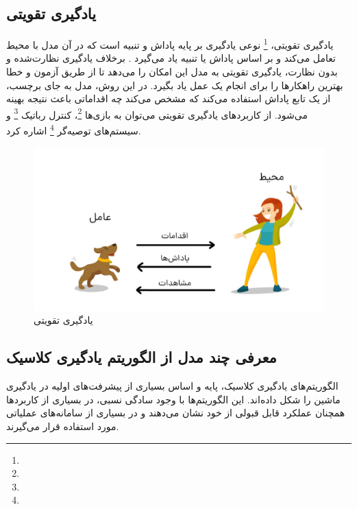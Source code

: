\subsection{یادگیری تقویتی}
یادگیری تقویتی، \footnote{} نوعی یادگیری بر پایه پاداش و تنبیه است که در آن مدل با محیط تعامل می‌کند و بر اساس پاداش یا تنبیه یاد می‌گیرد
\cite{sutton2018reinforcement}.
برخلاف یادگیری نظارت‌شده و بدون نظارت، یادگیری تقویتی به مدل این امکان را می‌دهد تا از طریق آزمون و خطا بهترین راهکارها را برای انجام یک عمل یاد بگیرد. در این روش، مدل به جای برچسب، از یک تابع پاداش استفاده می‌کند که مشخص می‌کند چه اقداماتی باعث نتیجه بهینه می‌شود. از کاربردهای یادگیری تقویتی می‌توان به بازی‌ها \footnote{}، کنترل رباتیک \footnote{} و سیستم‌های توصیه‌گر \footnote{} اشاره کرد.



\begin{figure}[h]
	\centering
	\begin{minipage}[b]{0.8\textwidth}
		\centering
		\includegraphics[width=\textwidth]{transformer_images/reinforcement_learning.jpg}
		\caption{یادگیری تقویتی}
		\label{fig:reinforcement learning}
	\end{minipage}
	\hfill
\end{figure}



\subsection{معرفی چند مدل از الگوریتم یادگیری کلاسیک}

الگوریتم‌های یادگیری کلاسیک، پایه و اساس بسیاری از پیشرفت‌های اولیه در یادگیری ماشین را شکل داده‌اند. این الگوریتم‌ها با وجود سادگی نسبی، در بسیاری از کاربردها همچنان عملکرد قابل قبولی از خود نشان می‌دهند و در بسیاری از سامانه‌های عملیاتی مورد استفاده قرار می‌گیرند.

